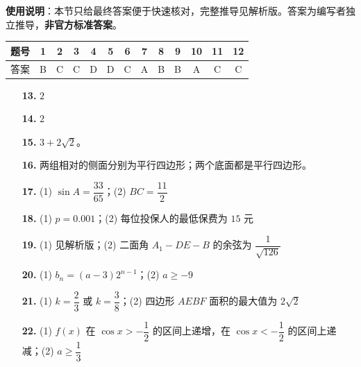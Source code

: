 
\begin{gknotice}
\textbf{使用说明}：本节只给最终答案便于快速核对，完整推导见解析版。答案为编写者独立推导，\textbf{非官方标准答案}。
\end{gknotice}

\begin{center}\begin{tabular}{ccccccccccccc}
\toprule
题号 & 1 & 2 & 3 & 4 & 5 & 6 & 7 & 8 & 9 & 10 & 11 & 12 \\
\midrule
答案 & B & C & C & D & D & C & A & B & B & A & C & C \\
\bottomrule
\end{tabular}\end{center}

\begin{itemize}[leftmargin=2.6em]
  \item[\textbf{13.}] $2$
  \item[\textbf{14.}] $2$
  \item[\textbf{15.}] $3+2\sqrt2$。
  \item[\textbf{16.}] 两组相对的侧面分别为平行四边形；两个底面都是平行四边形。
\end{itemize}

\begin{itemize}[leftmargin=2.6em]
  \item[\textbf{17.}] (1) $\sin A=\dfrac{33}{65}$；(2) $BC=\dfrac{11}{2}$
  \item[\textbf{18.}] (1) $p=0.001$；(2) 每位投保人的最低保费为 $15$ 元
  \item[\textbf{19.}] (1) 见解析版；(2) 二面角 $A_1-DE-B$ 的余弦为 $\dfrac1{\sqrt{126}}$
  \item[\textbf{20.}] (1) $b_n=(a-3)2^{n-1}$；(2) $a\geqslant-9$
  \item[\textbf{21.}] (1) $k=\dfrac23$ 或 $k=\dfrac38$；(2) 四边形 $AEBF$ 面积的最大值为 $2\sqrt2$
  \item[\textbf{22.}] (1) $f(x)$ 在 $\cos x>-\dfrac12$ 的区间上递增，在 $\cos x<-\dfrac12$ 的区间上递减；(2) $a\geqslant\dfrac13$
\end{itemize}
